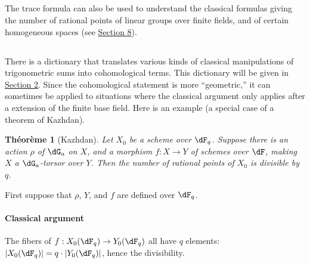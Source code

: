 \documentclass[oneside]{book}
\theoremstyle{sga-source}
\theoremstyle{sga-source-dash}
\theoremstyle{sga-source-dotdash}
\theoremstyle{sga-source-number-note-dash}
\theoremstyle{sga-source-note-number-dotdash}
\theoremstyle{sga-source-example-dotdash}
\theoremstyle{sga-source-inline-number}
\theoremstyle{sga-source-bare-number}
\theoremstyle{sga-source}
\newtheorem{theorem_}[subsection]{Théorème}
\newcommand{\PrintPage}[1]{}\newcommand{\MathPage}[1]{}\newcommand{\PrintCite}[2]{#1}\newcommand{\var}[3]{#2}
\begin{document}
\subsection{}\label{VI:1-11}

The trace formula can also be used to understand the classical formulas 
giving the number of rational points of linear groups over 
finite fields, and of certain homogeneous spaces (see \hyperref[VI:8]{Section 8}). 





\subsection{}\label{VI:1-12}

There is a dictionary that translates various kinds of classical 
manipulations of trigonometric sums into cohomological terms. This dictionary 
will be given in \hyperref[VI:2]{Section 2}. Since the cohomological statement is more 
``geometric,'' it can sometimes be applied 
to situations where the classical argument only applies after a 
extension of the finite base field. Here is an example (a special case of a 
theorem of Kazhdan).

\begin{theorem_}[Kazhdan]\label{VI:1-13}
Let $X_0$ be a scheme over $\dF_q$. Suppose there is an action $\rho$ of 
$\dG_a$ on $X$, and a morphism $f:X\to Y$ of schemes over $\dF$, making 
$X$ a $\dG_a$-torsor over $Y$. Then the number of rational points of $X_0$ 
is divisible by $q$.
\end{theorem_}

\PrintPage{176}
First suppose that $\rho$, $Y$, and $f$ are defined over $\dF_q$. 


\paragraph{Classical argument}
The fibers of $f:X_0(\dF_q)\to Y_0(\dF_q)$ all have $q$ elements: 
$|X_0(\dF_q)| = q\cdot |Y_0(\dF_q)|$, hence the divisibility. 
\end{document}
